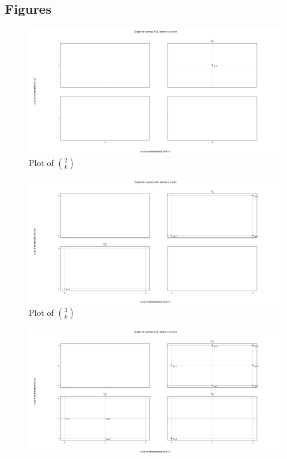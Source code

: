 \documentclass[10pt, twoside]{article}
\newcommand*{\Combination}[2]{\binom{#1}{#2}}%
\begin{document}
\begin{appendices}
\section{Figures}
\begin{figure}[ph!]
	\includegraphics[width=\linewidth]{2Ck.png}
	\caption{Plot of $\Combination{2}{k}$}
	\label{2Ck}
\end{figure}
\begin{figure}[ph!]	
	\includegraphics[width=\linewidth]{3Ck.png}
	\caption{Plot of $\Combination{3}{k}$}
	\label{3Ck}
\end{figure}
\begin{figure}[ph!]	
	\includegraphics[width=\linewidth]{4Ck.png}

\end{figure}
\end{appendices}
\end{document}
